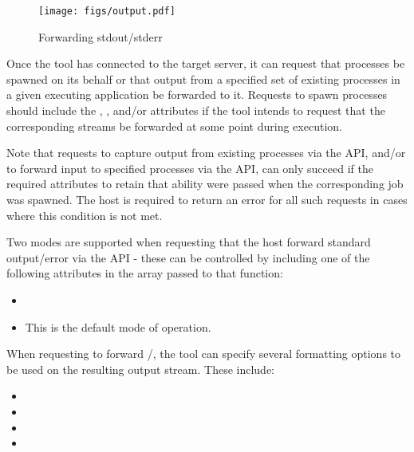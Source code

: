 \begingroup
\begin{figure*}[ht!]
  \begin{center}
    \texttt{[image: figs/output.pdf]}
  \end{center}
  \caption{Forwarding stdout/stderr}
  \label{fig:stdouterr}
\end{figure*}
\endgroup

Once the tool has connected to the target server, it can request that
processes be spawned on its behalf or that output from a specified set of
existing processes in a given executing application be forwarded to it.
Requests to spawn processes should include the ,
, and/or  attributes if the
tool intends to request that the corresponding streams be forwarded at some
point during execution.

Note that requests to capture output from existing processes via the
 \ac{API}, and/or to forward input to specified
processes via the  \ac{API}, can only succeed if the
required attributes to retain that ability were passed when the corresponding
job was spawned. The host is required to return an error for all such requests
in cases where this condition is not met.

Two modes are supported when requesting that the host forward standard output/error via the  \ac{API} - these can be controlled by including one of the following attributes in the  array passed to that function:

\begin{itemize}
    \item {}
    \item {}This is the default mode of operation.
    \pasteAttributeItemEnd{}
\end{itemize}

When requesting to forward /, the tool can specify several formatting options to be used on the resulting output stream. These include:

\begin{itemize}
    \item {}
    \item {}
    \item {}
    \item {}
\end{itemize}

